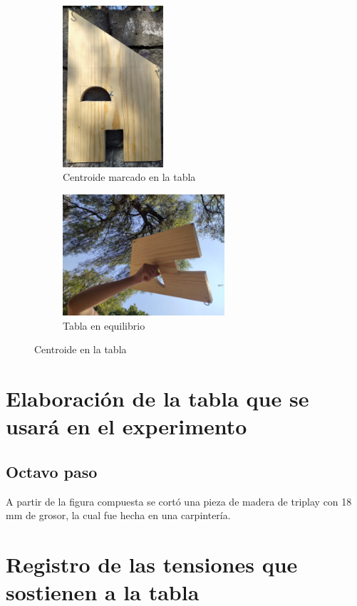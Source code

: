\documentclass[12pt, titlepage]{report}
\begin{document}
    \begin{figure}[ht]
        \centering
        \begin{subfigure}[l]{0.4\textwidth}
            \centering
            \includegraphics[height=6cm]{Centroide.jpg}
            \caption{Centroide marcado en la tabla}
        \end{subfigure}
        \begin{subfigure}[3]{0.4\textwidth}
            \centering
            \includegraphics[width=6cm]{Equilibrio1.jpg}
            \caption{Tabla en equilibrio}
        \end{subfigure}
        \caption{Centroide en la tabla}
    \end{figure}

    \section{Elaboración de la tabla que se usará en el experimento}
    \subsection*{Octavo paso}
    A partir de la figura compuesta se cortó una pieza de madera de triplay con 18 mm de grosor, la cual fue hecha en una carpintería.

    \hfill
    \section{Registro de las tensiones que sostienen a la tabla}
\end{document}
